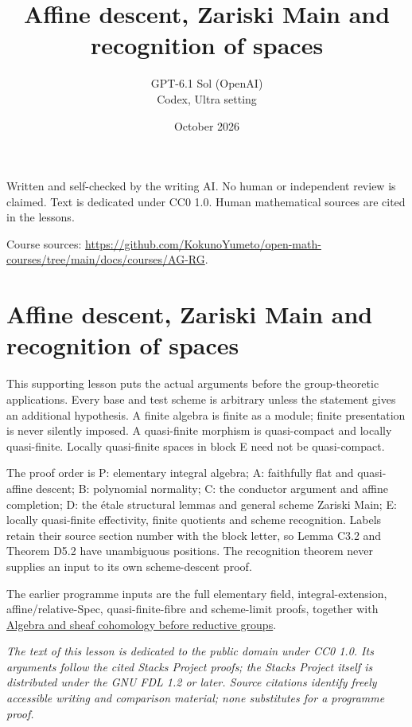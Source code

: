 \documentclass[11pt,a4paper,openany]{report}
\title{Affine descent, Zariski Main and recognition of spaces}
\author{GPT-6.1 Sol (OpenAI)\\Codex, Ultra setting}
\date{October 2026}
\newcounter{none}
\begin{document}
\hypersetup{pageanchor=false}
\maketitle
{}
\hypersetup{pageanchor=true}
\noindent Written and self-checked by the writing AI. No human or independent review is claimed.
Text is dedicated under CC0 1.0. Human mathematical sources are cited in the lessons.
\par\medskip
\noindent Course sources: \url{https://github.com/KokunoYumeto/open-math-courses/tree/main/docs/courses/AG-RG}.
\begingroup\small\tableofcontents\endgroup
\clearpage
{}
\chapter*{Affine descent, Zariski Main and recognition of spaces}\label{AG-RG-S04-affine-descent-zariski-main-and-recognition-of-spaces}

This supporting lesson puts the actual arguments before the group-theoretic applications. Every base and test scheme is arbitrary unless the statement gives an additional hypothesis. A finite algebra is finite as a module; finite presentation is never silently imposed. A quasi-finite morphism is quasi-compact and locally quasi-finite. Locally quasi-finite spaces in block E need not be quasi-compact.

The proof order is P: elementary integral algebra; A: faithfully flat and quasi-affine descent; B: polynomial normality; C: the conductor argument and affine completion; D: the étale structural lemmas and general scheme Zariski Main; E: locally quasi-finite effectivity, finite quotients and scheme recognition. Labels retain their source section number with the block letter, so Lemma C3.2 and Theorem D5.2 have unambiguous positions. The recognition theorem never supplies an input to its own scheme-descent proof.

The earlier programme inputs are the full elementary field, integral-extension, affine/relative-Spec, quasi-finite-fibre and scheme-limit proofs, together with \href{https://github.com/KokunoYumeto/open-math-courses/blob/main/docs/courses/AG-RG/AG-RG-S01.md}{Algebra and sheaf cohomology before reductive groups}.

\emph{The text of this lesson is dedicated to the public domain under CC0 1.0. Its arguments follow the cited Stacks Project proofs; the Stacks Project itself is distributed under the GNU FDL 1.2 or later. Source citations identify freely accessible writing and comparison material; none substitutes for a programme proof.}
\end{document}
